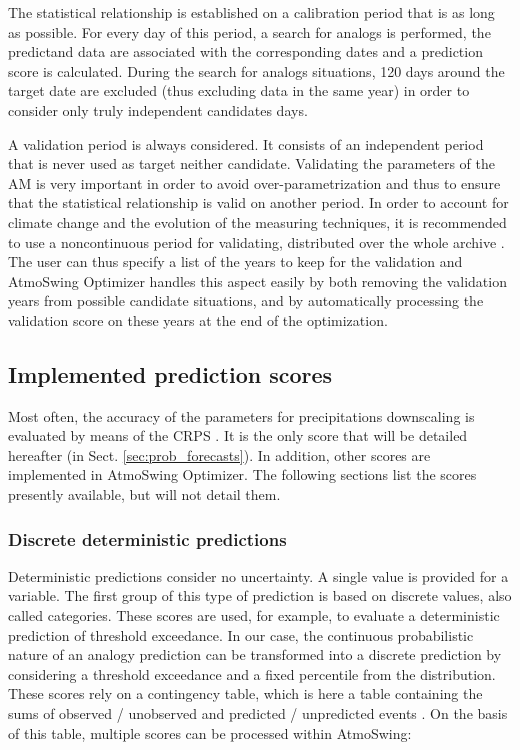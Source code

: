 \documentclass[review]{elsarticle}
\begin{document}
The statistical relationship is established on a calibration period that is as long as possible. For every day of this period, a search for analogs is performed, the predictand data are associated with the corresponding dates and a prediction score is calculated. During the search for analogs situations, 120 days around the target date are excluded (thus excluding data in the same year) in order to consider only truly independent candidates days.

A validation period is always considered. It consists of an independent period that is never used as target neither candidate. Validating the parameters of the AM is very important in order to avoid over-parametrization and thus to ensure that the statistical relationship is valid on another period. In order to account for climate change and the evolution of the measuring techniques, it is recommended to use a noncontinuous period for validating, distributed over the whole archive \citep{BenDaoud2010}. The user can thus specify a list of the years to keep for the validation and AtmoSwing Optimizer handles this aspect easily by both removing the validation years from possible candidate situations, and by automatically processing the validation score on these years at the end of the optimization.


\subsection{Implemented prediction scores}
\label{sec:forecasts-scores}

Most often, the accuracy of the parameters for precipitations downscaling is evaluated by means of the CRPS \citep[Continuous Ranked Probability Score,][]{Brown1974, Matheson1976, Hersbach2000}. It is the only score that will be detailed hereafter (in Sect. \ref{sec:prob_forecasts}). In addition, other scores are implemented in AtmoSwing Optimizer. The following sections list the scores presently available, but will not detail them.


\subsubsection{Discrete deterministic predictions}

Deterministic predictions consider no uncertainty. A single value is provided for a variable. The first group of this type of prediction is based on discrete values, also called categories. These scores are used, for example, to evaluate a deterministic prediction of threshold exceedance. In our case, the continuous probabilistic nature of an analogy prediction can be transformed into a discrete prediction by considering a threshold exceedance and a fixed percentile from the distribution. These scores rely on a contingency table, which is here a table containing the sums of observed / unobserved and predicted / unpredicted events \citep{Wilks2006}. On the basis of this table, multiple scores can be processed within AtmoSwing:
\end{document}
